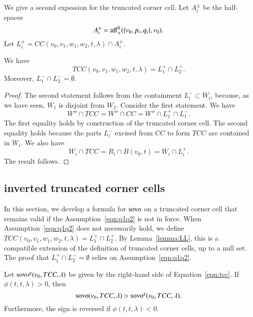 We give a second expession for the truncated corner cell.
Let $A_i^\pm$ be the half-spaces
$$
  A_i^\pm = {\operatorname{aff}}_\pm^0(\{v_0,p_i,q_i\},v_0).
$$
Let $L_i^\pm = CC(v_0,v_1,w_1,w_2,t,\lambda)\cap A_i^\pm$.

\begin{lemma}\label{lemma:LL}
We have
  $$
  TCC(v_0,v_1,w_1,w_2,t,\lambda) = L_1^+\cap L_2^+.
  $$
Moreover, 
$L_1^-\cap L_2^- =\emptyset$.
\end{lemma}

\begin{proof}
The second statement follows from the containment
   $L_i^- \subset W_i$, because, as we have seen,
$W_1$ is disjoint
from $W_2$.
Consider the first statement.  
We have
 $$
 W'' \cap TCC = W'' \cap CC = W'' \cap L_1^+ \cap L_1^-.
 $$
The first equality holds by construction of the truncated corner
cell.  The second equality holds because the parts $L_i^-$ excised
from $CC$ to form $TCC$ are contained in $W_i$.
We also have
  $$
  W_i \cap TCC = R_i \cap B(v_0,t) = W_i  \cap L_i^+.
  $$
The result follows.
\end{proof}




\subsection{inverted truncated corner cells}

In this section, we develop a formula for ${\operatorname{sovo}}$ on 
a truncated corner cell that remains valid if the 
Assumption~\ref{eqn:q1q2} is not in force.
When Assumption~\ref{eqn:q1q2} does not necessarily hold, we
define $TCC(v_0,v_1,w_1,w_2,t,\lambda) = L_1^+ \cap L_2^+$.
By Lemma~\ref{lemma:LL}, 
this is a compatible extension of the definition
of truncated corner cells, up to a null set.
The proof that $L_1^+\cap L_2^- = \emptyset$ 
relies on Assumption~\ref{eqn:q1q2}.


\begin{lemma} Let ${\operatorname{sovo}}^g(v_0,TCC,\lambda)$ be given
by the right-hand side of Equation~\ref{eqn:tcc}.
If $\phi(t,t,\lambda) > 0$, then
   $$
   {\operatorname{sovo}}(v_0,TCC,\lambda) > {\operatorname{sovo}}^g(v_0,TCC,\lambda).
   $$
Furthermore, the sign is reversed if $\phi(t,t,\lambda) < 0$.
\end{lemma}

